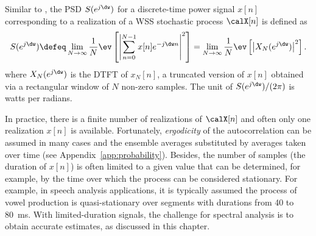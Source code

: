 
Similar to , the PSD $S(e^{j \dw})$ for a discrete-time power signal $x[n]$ corresponding to a realization of a WSS stochastic process $\calX[n]$ is defined as
\begin{equation}
S(e^{j \dw}) \defeq \lim_{N \rightarrow \infty} \frac 1 N \ev \left[ \left| \sum_{n=0}^{N-1} x[n] e^{-j \dw n} \right|^2  \right] = \lim_{N \rightarrow \infty} \frac 1 N \ev \left[ \left| X_N(e^{j \dw}) \right|^2  \right].
\label{eq:psd_discretetime}
\end{equation}
where $X_N(e^{j \dw})$ is the DTFT of $x_N[n]$, a truncated version of $x[n]$ obtained via a rectangular window of $N$ non-zero samples.
The unit of $S(e^{j \dw})/(2 \pi)$ is watts per radians.

In practice, there is a finite number of realizations of $\calX[n]$ and often only one realization $x[n]$ is available. Fortunately, \emph{ergodicity} of the autocorrelation can be assumed in many cases and the ensemble averages substituted by averages taken over time (see Appendix~\ref{app:probability}). Besides, the number of samples (the duration of $x[n]$) is often limited to a given value that can be determined, for example, by the time over which the process can be considered stationary. For example, in speech analysis applications, it is typically assumed the process of vowel production is quasi-stationary over segments with durations from 40 to 80~ms. With limited-duration signals, the challenge for spectral analysis is to obtain accurate estimates, as discussed in this chapter.

